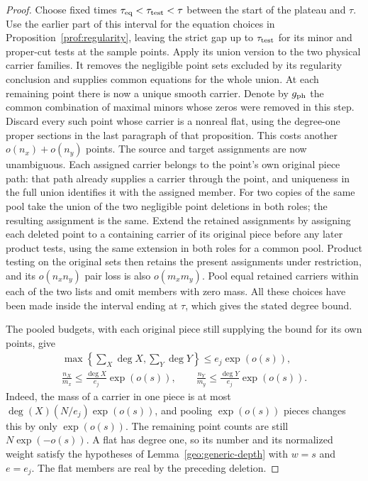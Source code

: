 \begin{proof}
Choose fixed times $\tau_{\rm eq}<\tau_{\rm test}<\tau$ between the start
of the plateau and $\tau$.  Use the earlier part of this interval for
the equation choices in Proposition~\ref{prof:regularity}, leaving the
strict gap up to $\tau_{\rm test}$ for its minor and proper-cut tests at
the sample points.  Apply its union version to the two physical carrier families.
It removes the negligible point sets excluded by its regularity conclusion
and supplies common equations for the whole union.  At each remaining
point there is now a unique smooth carrier.  Denote by $g_{\rm ph}$ the
common combination of maximal minors whose zeros were removed in this
step.  Discard every such point
whose carrier is a nonreal flat, using the degree-one proper sections in
the last paragraph of that proposition.  This costs another
$o(n_x)+o(n_y)$ points.  The source and target assignments are now
unambiguous.  Each assigned carrier belongs to the point's own original
piece path: that path already supplies a carrier through the point, and
uniqueness in the full union identifies it with the assigned member.
For two copies of the same pool take the union of the two negligible
point deletions in both roles; the resulting assignment is the same.
Extend the retained assignments by assigning each deleted point to a
containing carrier of its original piece before any later product tests,
using the same extension in both roles for a common pool.  Product testing
on the original sets then retains the present assignments under restriction, and its
$o(n_xn_y)$ pair loss is also $o(m_xm_y)$.  Pool equal retained carriers
within each of the two lists and omit members with zero mass.
All these choices have been made inside the interval ending at $\tau$,
which gives the stated degree bound.

The pooled budgets, with each original piece still supplying the bound
for its own points, give
\begin{equation}\label{sc:retained-carrier-weights}
 \begin{gathered}
 \max\left\{\sum_X\deg X,\sum_Y\deg Y\right\}\le e_j\exp(o(s)),\\
 \frac{n_X}{m_x}\le\frac{\deg X}{e_j}\exp(o(s)),\qquad
 \frac{n_Y}{m_y}\le\frac{\deg Y}{e_j}\exp(o(s)).
 \end{gathered}
\end{equation}
Indeed, the mass of a carrier in one piece is at most
$\deg(X)(N/e_j)\exp(o(s))$, and pooling $\exp(o(s))$ pieces changes
this by only $\exp(o(s))$.  The remaining point counts are still
$N\exp(-o(s))$.  A flat has degree one, so its number and its normalized
weight satisfy the hypotheses of Lemma~\ref{geo:generic-depth} with
$w=s$ and $e=e_j$.  The flat members are real by the preceding deletion.


\end{proof}
